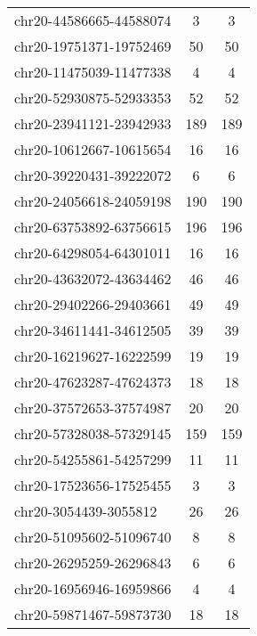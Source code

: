 \begin{longtable}{lSS}
	chr20-44586665-44588074 & 3    & 3                               \\
	chr20-19751371-19752469 & 50   & 50                              \\
	chr20-11475039-11477338 & 4    & 4                               \\
	chr20-52930875-52933353 & 52   & 52                              \\
	chr20-23941121-23942933 & 189  & 189                             \\
	chr20-10612667-10615654 & 16   & 16                              \\
	chr20-39220431-39222072 & 6    & 6                               \\
	chr20-24056618-24059198 & 190  & 190                             \\
	chr20-63753892-63756615 & 196  & 196                             \\
	chr20-64298054-64301011 & 16   & 16                              \\
	chr20-43632072-43634462 & 46   & 46                              \\
	chr20-29402266-29403661 & 49   & 49                              \\
	chr20-34611441-34612505 & 39   & 39                              \\
	chr20-16219627-16222599 & 19   & 19                              \\
	chr20-47623287-47624373 & 18   & 18                              \\
	chr20-37572653-37574987 & 20   & 20                              \\
	chr20-57328038-57329145 & 159  & 159                             \\
	chr20-54255861-54257299 & 11   & 11                              \\
	chr20-17523656-17525455 & 3    & 3                               \\
	chr20-3054439-3055812   & 26   & 26                              \\
	chr20-51095602-51096740 & 8    & 8                               \\
	chr20-26295259-26296843 & 6    & 6                               \\
	chr20-16956946-16959866 & 4    & 4                               \\
	chr20-59871467-59873730 & 18   & 18                              \\

\end{longtable}
